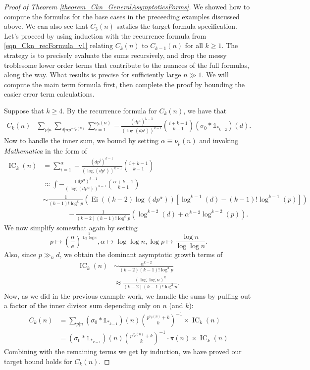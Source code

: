\documentclass[11pt,reqno,a4letter]{article}
\numberwithin{figure}{section}
\numberwithin{table}{section}
\theoremstyle{plain}
\numberwithin{theorem}{section}
\theoremstyle{definition}
\begin{document}
\begin{proof}[Proof of Theorem \ref{theorem_Ckn_GeneralAsymptoticsForms}] 
We showed how to compute the formulas for the base cases in the preceeding examples 
discussed above. We can also see that $C_3(n)$ satsfies the target formula specification. 
Let's proceed by using induction with the recurrence formula from 
\eqref{eqn_Ckn_recFormula_v1} 
relating $C_k(n)$ to $C_{k-1}(n)$ for all $k \geq 1$. The strategy is to 
precisely evaluate the sums recursively, and drop the messy troblesome lower order 
terms that contribute to the nuances of the full formulas, along the way. What results is 
precise for sufficiently large $n \gg 1$. 
We will compute the main term formula first, then complete the proof 
by bounding the easier error term calculations. 

Suppose that $k \geq 4$. By the recurrence formula for $C_k(n)$, we have that 
\begin{align*} 
C_k(n) & \sum_{p|n} \sum_{d|np^{-\nu_p(n)}} \sum_{i=1}^{\nu_p(n)} -\frac{(dp^i)^{k-1}}{(\log(dp^i))^{k-1}} 
     \binom{i+k-1}{k-1} (\sigma_0 \ast \mathds{1}_{\ast_{k-2}})(d). 
\end{align*} 
Now to handle the inner sum, we bound by setting $\alpha \equiv \nu_p(n)$ and 
invoking \emph{Mathematica} in the form of 
\begin{align*} 
\operatorname{IC}_k(n) & = \sum_{i=1}^{\alpha} -\frac{(dp^i)^{k-1}}{(\log(dp^i))^{k-1}} 
     \binom{i+k-1}{k-1} \\ 
     & \approx \int -\frac{(dp^{\alpha})^{k-1}}{(\log(dp^{\alpha}))^{k-1}} 
     \binom{\alpha+k-1}{k-1} \\ 
     & \sim \frac{1}{(k-1)! \log^k p} \left( 
     \operatorname{Ei}((k-2) \log(dp^{\alpha})) \left[
     \log^{k-1}(d) - (k-1)! \log^{k-1}(p)\right] 
     \right) \\ 
     & \phantom{\approx\qquad\ } - 
     \frac{1}{(k-2) (k-1)! \log^k p} \left( 
     \log^{k-2}(d) + \alpha^{k-2} \log^{k-2}(p) 
     \right). 
\end{align*} 
We now simplify somewhat again by setting
$$p \mapsto \left(\frac{n}{e}\right)^{\frac{1}{\log\log n}}, \alpha \mapsto \log\log n, 
  \log p \mapsto \frac{\log n}{\log\log n}.$$ 
Also, since $p \gg_{n} d$, we obtain the dominant asymptotic growth terms of 
\begin{align*} 
\operatorname{IC}_k(n) & \sim \frac{\alpha^{k-2}}{(k-2) (k-1)! \log^2 p} \\ 
     & \approx \frac{(\log\log n)^k}{(k-2) (k-1)! \log^2 n}. 
\end{align*} 
Now, as we did in the previous example work, we handle the sums by pulling out a factor of the inner 
divisor sum depending only on $n$ (and $k$): 
\begin{align*} 
C_k(n) & = \sum_{p|n} (\sigma_0 \ast \mathds{1}_{\ast_{k-1}})(n) 
     \binom{p^{\nu_p(n)} + k}{k}^{-1} \times \operatorname{IC}_k(n) \\ 
     & = (\sigma_0 \ast \mathds{1}_{\ast_{k-1}})(n) 
     \binom{p^{\nu_p(n)} + k}{k}^{-1} \cdot \pi(n) \times \operatorname{IC}_k(n)
\end{align*} 
Combining with the remaining terms we get by induction, we have proved our target bound holds 
for $C_k(n)$. 


\end{proof}
\end{document}
